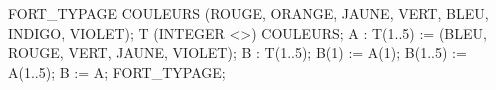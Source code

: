 \begin{programs}[0.5cm]
\PROCEDURE FORT\_TYPAGE \IS
  \TYPE COULEURS \IS
           (ROUGE, ORANGE, JAUNE, VERT, BLEU, INDIGO, VIOLET);
  \TYPE T \IS \ARRAY (INTEGER \RANGE <>) \OF COULEURS;
  A : T(1..5) := (BLEU, ROUGE, VERT, JAUNE, VIOLET);
  B : T(1..5);
\BEGIN
  B(1) := A(1);
  B(1..5) := A(1..5);
  B := A;
\END FORT\_TYPAGE;
\end{programs}